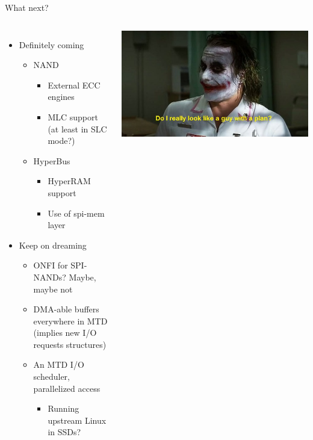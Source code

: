 \documentclass[aspectratio=169,obeyspaces,spaces,hyphens,dvipsnames]{beamer}
\begin{document}
\begin{frame}{What next?}
  \begin{columns}
    \begin{itemize}
    \item Definitely coming
      \begin{itemize}
      \item NAND
        \begin{itemize}
        \item External ECC engines
        \item MLC support (at least in SLC mode?)
        \end{itemize}
      \item HyperBus
        \begin{itemize}
        \item HyperRAM support
        \item Use of spi-mem layer
        \end{itemize}
      \end{itemize}
      \vfill
    \item Keep on dreaming
      \begin{itemize}
      \item ONFI for SPI-NANDs? Maybe, maybe not
      \item DMA-able buffers everywhere in MTD\\ (implies new I/O requests
        structures)
      \item An MTD I/O scheduler, parallelized access
        \begin{itemize}
        \item Running upstream Linux in SSDs?
        \end{itemize}
      \end{itemize}
    \end{itemize}
    \begin{center}
      \includegraphics[scale=0.30]{plan.jpg}
    \end{center}
  \end{columns}
\end{frame}
\end{document}
